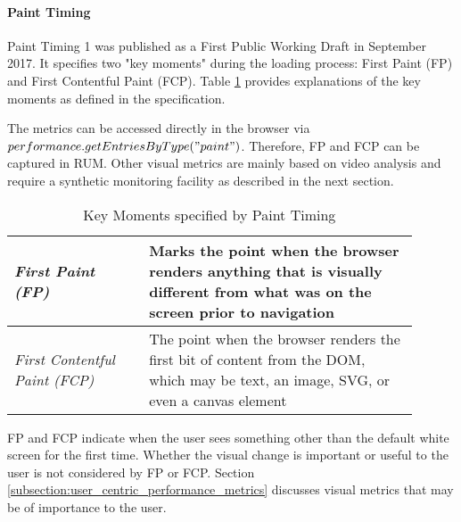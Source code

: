 
\paragraph{Paint Timing} %

Paint Timing 1 was published as a First Public Working Draft in September 2017.  
It specifies two "key moments" during the loading process: First Paint (FP) and First Contentful Paint (FCP).
Table \ref{table:paint_timing} provides explanations of the key moments as defined in the specification. %

The metrics can be accessed directly in the browser via $performance.getEntriesByType("paint")$.
Therefore, FP and FCP can be captured in RUM.
Other visual metrics are mainly based on video analysis and require a synthetic monitoring facility as described in the next section.

\begin{table}[h]
	\small
	\centering
	\begin{tabular}{ | p{0.3\linewidth} | p{0.6\linewidth} | }
	\hline
	\textit{First Paint (FP)} & Marks the point when the browser renders anything that is visually different from what was on the screen prior to navigation \\ 
	\hline
	\textit{First Contentful Paint (FCP)} & The point when the browser renders the first bit of content from the DOM, which may be text, an image, SVG, or even a canvas element \\  
	\hline
	\end{tabular}
	\medskip
	\caption{Key Moments specified by Paint Timing}
	\label{table:paint_timing}
\end{table}

FP and FCP indicate when the user sees something other than the default white screen for the first time.
Whether the visual change is important or useful to the user is not considered by FP or FCP. %
Section \ref{subsection:user_centric_performance_metrics} discusses visual metrics that may be of importance to the user.



